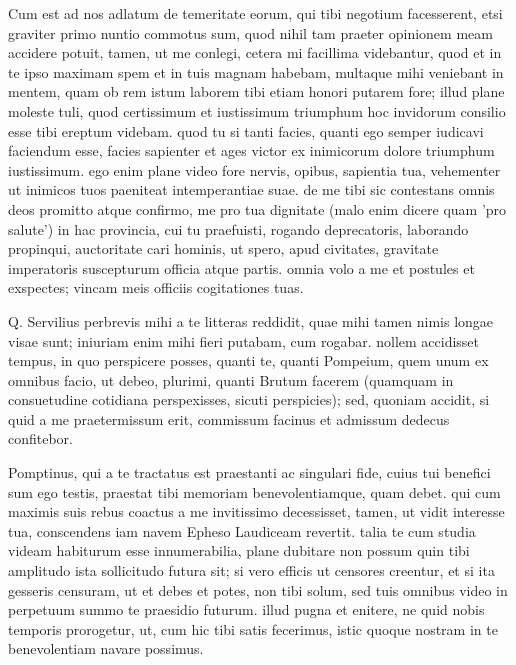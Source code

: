 


 Cum est ad nos adlatum de temeritate eorum, qui tibi negotium facesserent, etsi graviter primo nuntio commotus sum, quod nihil tam praeter opinionem meam accidere potuit, tamen, ut me conlegi, cetera mi facillima videbantur, quod et in te ipso maximam spem et in tuis magnam habebam, multaque mihi veniebant in mentem, quam ob rem istum laborem tibi etiam honori putarem fore; illud plane moleste tuli, quod certissimum et iustissimum triumphum hoc invidorum consilio esse tibi ereptum videbam. quod tu si tanti facies, quanti ego semper iudicavi faciendum esse, facies sapienter et ages victor ex inimicorum dolore triumphum iustissimum. ego enim plane video fore nervis, opibus, sapientia tua, vehementer ut inimicos tuos paeniteat intemperantiae suae. de me tibi sic contestans omnis deos promitto atque confirmo, me pro tua dignitate (malo enim dicere quam 'pro salute') in hac provincia, cui tu praefuisti, rogando deprecatoris, laborando propinqui, auctoritate cari hominis, ut spero, apud civitates, gravitate imperatoris suscepturum officia atque partis. omnia volo a me et postules et exspectes; vincam meis officiis cogitationes tuas.

 Q. Servilius perbrevis mihi a te litteras reddidit, quae mihi tamen nimis longae visae sunt; iniuriam enim mihi fieri putabam, cum rogabar. nollem accidisset tempus, in quo perspicere posses, quanti te, quanti Pompeium, quem unum ex omnibus facio, ut debeo, plurimi, quanti Brutum facerem (quamquam in consuetudine cotidiana perspexisses, sicuti perspicies); sed, quoniam accidit, si quid a me praetermissum erit, commissum facinus et admissum dedecus confitebor.

 Pomptinus, qui a te tractatus est praestanti ac singulari fide, cuius tui benefici sum ego testis, praestat tibi memoriam benevolentiamque, quam debet. qui cum maximis suis rebus coactus a me invitissimo decessisset, tamen, ut vidit interesse tua, conscendens iam navem Epheso Laudiceam revertit. talia te cum studia videam habiturum esse innumerabilia, plane dubitare non possum quin tibi amplitudo ista sollicitudo futura sit; si vero efficis ut censores creentur, et si ita gesseris censuram, ut et debes et potes, non tibi solum, sed tuis omnibus video in perpetuum summo te praesidio futurum. illud pugna et enitere, ne quid nobis temporis prorogetur, ut, cum hic tibi satis fecerimus, istic quoque nostram in te benevolentiam navare possimus.

